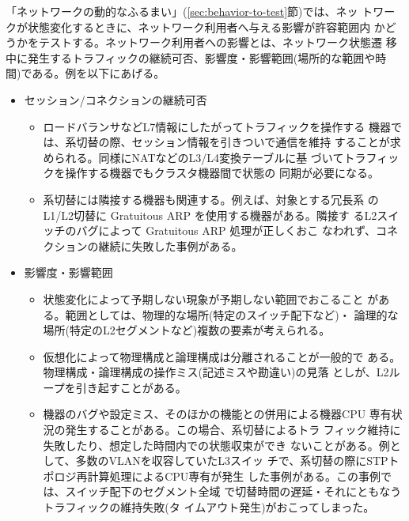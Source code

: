 「ネットワークの動的なふるまい」(\ref{sec:behavior-to-test}節)では、ネッ
トワークが状態変化するときに、ネットワーク利用者へ与える影響が許容範囲内
かどうかをテストする。ネットワーク利用者への影響とは、ネットワーク状態遷
移中に発生するトラフィックの継続可否、影響度・影響範囲(場所的な範囲や時
間)である。例を以下にあげる。
\begin{itemize}
 \item セッション/コネクションの継続可否
       \begin{itemize}
        \item ロードバランサなどL7情報にしたがってトラフィックを操作する
              機器では、系切替の際、セッション情報を引きついで通信を維持
              することが求められる。同様にNATなどのL3/L4変換テーブルに基
              づいてトラフィックを操作する機器でもクラスタ機器間で状態の
              同期が必要になる。
        \item 系切替には隣接する機器も関連する。例えば、対象とする冗長系
              のL1/L2切替に Gratuitous ARP を使用する機器がある。隣接す
              るL2スイッチのバグによって Gratuitous ARP 処理が正しくおこ
              なわれず、コネクションの継続に失敗した事例がある。
       \end{itemize}
 \item 影響度・影響範囲
       \begin{itemize}
        \item 状態変化によって予期しない現象が予期しない範囲でおこること
              がある。範囲としては、物理的な場所(特定のスイッチ配下など)・
              論理的な場所(特定のL2セグメントなど)複数の要素が考えられる。
        \item 仮想化によって物理構成と論理構成は分離されることが一般的で
              ある。物理構成・論理構成の操作ミス(記述ミスや勘違い)の見落
              としが、L2ループを引き起すことがある。
        \item 機器のバグや設定ミス、そのほかの機能との併用による機器CPU
              専有状況の発生することがある。この場合、系切替によるトラ
              フィック維持に失敗したり、想定した時間内での状態収束ができ
              ないことがある。例として、多数のVLANを収容していたL3スイッ
              チで、系切替の際にSTPトポロジ再計算処理によるCPU専有が発生
              した事例がある。この事例では、スイッチ配下のセグメント全域
              で切替時間の遅延・それにともなうトラフィックの維持失敗(タ
              イムアウト発生)がおこってしまった。
       \end{itemize}
\end{itemize}


